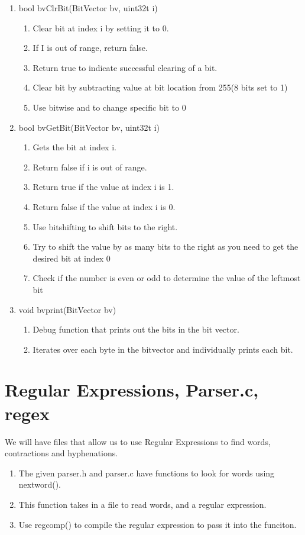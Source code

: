 \documentclass[11pt]{article}
\begin{document}
\begin{enumerate}
\begin{enumerate}
	\end{enumerate}
\item bool bvClrBit(BitVector bv, uint32t i)
	\begin{enumerate}
	\item Clear bit at index i by setting it to 0.
	\item If I is out of range, return false.
	\item Return true to indicate successful clearing of a bit.
	\item Clear bit by subtracting value at bit location from 255(8 bits set to 1)
	\item Use bitwise and to change specific bit to 0
	\end{enumerate}
\item bool bvGetBit(BitVector bv, uint32t i)
	\begin{enumerate}
	\item Gets the bit at index i.
	\item Return false if i is out of range.
	\item Return true if the value at index i is 1.
	\item Return false if the value at index i is 0.
	\item Use bitshifting to shift bits to the right.
	\item Try to shift the value by as many bits to the right as you need to get the desired bit at index 0
	\item Check if the number is even or odd to determine the value of the leftmost bit
	\end{enumerate}
\item void bvprint(BitVector bv)
	\begin{enumerate}
	\item Debug function that prints out the bits in the bit vector.
	\item Iterates over each byte in the bitvector and individually prints each bit.
	\end{enumerate}
\end{enumerate}

\section{Regular Expressions, Parser.c, regex}\label{ss:regex}
We will have files that allow us to use Regular Expressions to find words, contractions and hyphenations.

\begin{enumerate}
\item The given parser.h and parser.c have functions to look for words using nextword().
\item This function takes in a file to read words, and a regular expression.
\item Use regcomp() to compile the regular expression to pass it into the funciton.
\end{enumerate}
\end{document}
